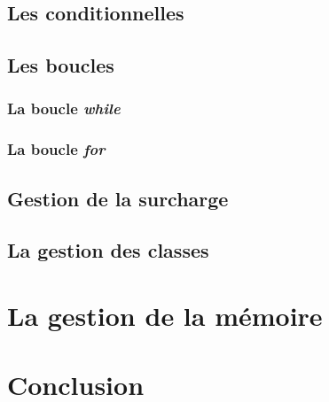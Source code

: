 \documentclass[12pt]{article}
\begin{document}
\subsection{Les conditionnelles}

\subsection{Les boucles}

\subsubsection{La boucle \em{while}}

\subsubsection{La boucle \em{for}}

\subsection{Gestion de la surcharge}

\subsection{La gestion des classes}

\section{La gestion de la mémoire}

\section{Conclusion}
\end{document}
